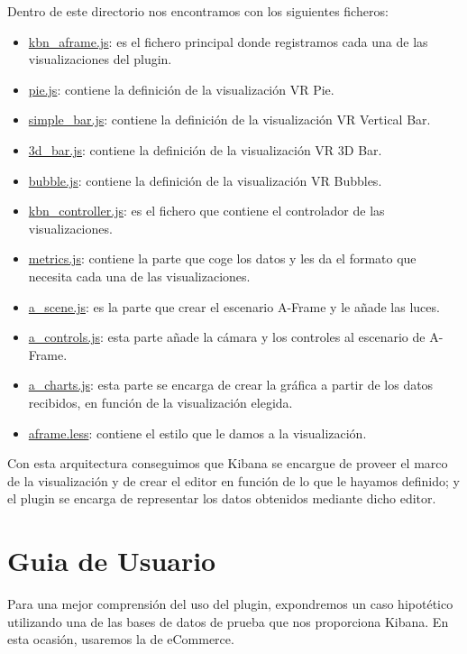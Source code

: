\documentclass[a4paper, 12pt]{book}
\begin{document}
Dentro de este directorio nos encontramos con los siguientes ficheros:

\begin{itemize}
    \item \underline{kbn\_aframe.js}: es el fichero principal donde registramos cada una de las visualizaciones del plugin.
    \item \underline{pie.js}: contiene la definición de la visualización VR Pie.
    \item \underline{simple\_bar.js}: contiene la definición de la visualización VR Vertical Bar.
    \item \underline{3d\_bar.js}: contiene la definición de la visualización VR 3D Bar.
    \item \underline{bubble.js}: contiene la definición de la visualización VR Bubbles.
    \item \underline{kbn\_controller.js}: es el fichero que contiene el controlador de las visualizaciones.
    \item \underline{metrics.js}: contiene la parte que coge los datos y les da el formato que necesita cada una de las visualizaciones.
    \item \underline{a\_scene.js}: es la parte que crear el escenario A-Frame y le añade las luces.
    \item \underline{a\_controls.js}: esta parte añade la cámara y los controles al escenario de A-Frame.
    \item \underline{a\_charts.js}: esta parte se encarga de crear la gráfica a partir de los datos recibidos, en función de la visualización elegida.
    \item \underline{aframe.less}: contiene el estilo que le damos a la visualización.
\end{itemize}

Con esta arquitectura conseguimos que Kibana se encargue de proveer el marco de la visualización y de crear el editor en función de lo que le hayamos definido; y el plugin se encarga de representar los datos obtenidos mediante dicho editor.


\section{Guia de Usuario}
\label{sec:guiausuario}

Para una mejor comprensión del uso del plugin, expondremos un caso hipotético utilizando una de las bases de datos de prueba que nos proporciona Kibana. En esta ocasión, usaremos la de eCommerce. 
\end{document}
